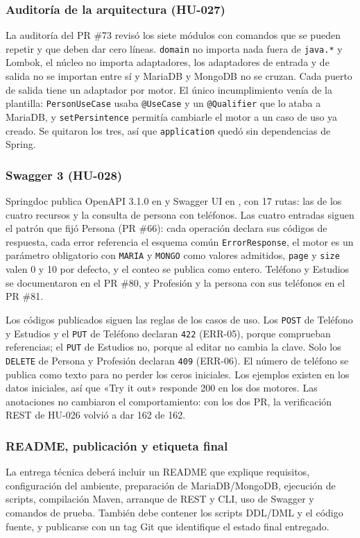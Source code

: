 \documentclass[11pt,a4paper]{article}
\begin{document}
\subsubsection*{Auditoría de la arquitectura (HU-027)}
La auditoría del PR \#73 revisó los siete módulos con comandos que se pueden
repetir y que deben dar cero líneas. \texttt{domain} no importa nada fuera de
\texttt{java.*} y Lombok, el núcleo no importa adaptadores, los adaptadores de
entrada y de salida no se importan entre sí y MariaDB y MongoDB no se cruzan.
Cada puerto de salida tiene un adaptador por motor. El único incumplimiento venía
de la plantilla: \texttt{PersonUseCase} usaba \texttt{@UseCase} y un
\texttt{@Qualifier} que lo ataba a MariaDB, y \texttt{setPersintence} permitía
cambiarle el motor a un caso de uso ya creado. Se quitaron los tres, así que
\texttt{application} quedó sin dependencias de Spring.

\subsubsection*{Swagger 3 (HU-028)}
Springdoc publica OpenAPI 3.1.0 en  y Swagger UI en
, con 17 rutas: las de los cuatro recursos y la consulta de
persona con teléfonos. Las cuatro entradas siguen el patrón que fijó Persona (PR
\#66): cada operación declara sus códigos de respuesta, cada error referencia el
esquema común \texttt{ErrorResponse}, el motor es un parámetro obligatorio con
\texttt{MARIA} y \texttt{MONGO} como valores admitidos, \texttt{page} y
\texttt{size} valen 0 y 10 por defecto, y el conteo se publica como entero.
Teléfono y Estudios se documentaron en el PR \#80, y Profesión y la persona con
sus teléfonos en el PR \#81.

Los códigos publicados siguen las reglas de los casos de uso. Los
\texttt{POST} de Teléfono y Estudios y el \texttt{PUT} de Teléfono declaran
\texttt{422} (ERR-05), porque comprueban referencias; el \texttt{PUT} de
Estudios no, porque al editar no cambia la clave. Solo los \texttt{DELETE} de
Persona y Profesión declaran \texttt{409} (ERR-06). El número de teléfono se
publica como texto para no perder los ceros iniciales. Los ejemplos existen en
los datos iniciales, así que «Try it out» responde 200 en los dos motores. Las
anotaciones no cambiaron el comportamiento: con los dos PR, la verificación REST
de HU-026 volvió a dar 162 de 162.

\subsubsection*{README, publicación y etiqueta final}
La entrega técnica deberá incluir un README que explique requisitos,
configuración del ambiente, preparación de MariaDB/MongoDB, ejecución de
scripts, compilación Maven, arranque de REST y CLI, uso de Swagger y
comandos de prueba. También debe contener los scripts DDL/DML y el
código fuente, y publicarse con un tag Git que identifique el estado
final entregado.
\end{document}
